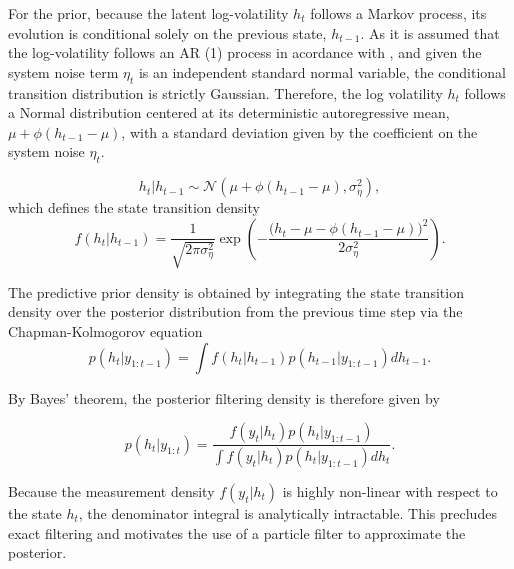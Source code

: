 \documentclass[10pt, a4paper]{article}
\numberwithin{equation}{section}
\begin{document}
For the prior, because the latent log-volatility $h_t$ follows a Markov process, its evolution is conditional solely on the previous state, $h_{t-1}$. As it is assumed that the log-volatility follows an AR (1) process in acordance with \textcite{Taylor1999}, and given the system noise term $\eta_t$ is an independent standard normal variable, the conditional transition distribution is strictly Gaussian. Therefore, the log volatility $h_t$ follows a Normal distribution centered at its deterministic autoregressive mean, $\mu + \phi (h_{t-1} - \mu)$, with a standard deviation given by the coefficient on the system noise $\eta_t$.

\begin{equation}
    h_t | h_{t-1} \sim \mathcal{N}\left(\mu + \phi(h_{t-1} - \mu), \sigma_\eta^2\right),
\end{equation}
which defines the state transition density
\begin{equation}
    f(h_t | h_{t-1}) = \frac{1}{\sqrt{2\pi\sigma_\eta^2}} \exp\left(-\frac{{\big(h_t - \mu - \phi(h_{t-1} - \mu)\big)}^2}{2\sigma_\eta^2}\right).
\end{equation}

The predictive prior density is obtained by integrating the state transition density over the posterior distribution from the previous time step via the Chapman-Kolmogorov equation \parencite{Arulampalam2002}
\begin{equation}
    p(h_t | y_{1:t-1}) = \int f(h_t | h_{t-1}) p(h_{t-1} | y_{1:t-1}) dh_{t-1}.
\end{equation}

By Bayes' theorem, the posterior filtering density is therefore given by

\begin{equation}
    p(h_t | y_{1:t}) = \frac{f(y_t | h_t) p(h_t | y_{1:t-1})}{\int f(y_t | h_t) p(h_t | y_{1:t-1}) dh_t}.
\end{equation}

Because the measurement density \(f(y_t | h_t)\) is highly non-linear with respect to the state \(h_t\), the denominator integral is analytically intractable. This precludes exact filtering and motivates the use of a particle filter to approximate the posterior.
\end{document}
